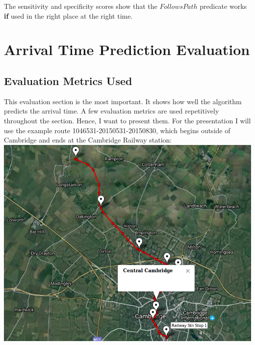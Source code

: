 \documentclass[12pt,a4paper,oneside,openright]{report}
\begin{document}
The sensitivity and specificity scores show that the $FollowsPath$
predicate works \textbf{if} used in the right place at the right time.

\newpage

\section{Arrival Time Prediction Evaluation}

\subsection{Evaluation Metrics Used}

This evaluation section is the most important. It shows how well the algorithm
predicts the arrival time. A few evaluation metrics are used repetitively
throughout the section. Hence, I want to present them. For the presentation I
will use the example route 1046531-20150531-20150830, which begins outside of
Cambridge and ends at the Cambridge Railway station: \\

\includegraphics[width=\textwidth]{figs/cambridge_route.png} \\
\end{document}
